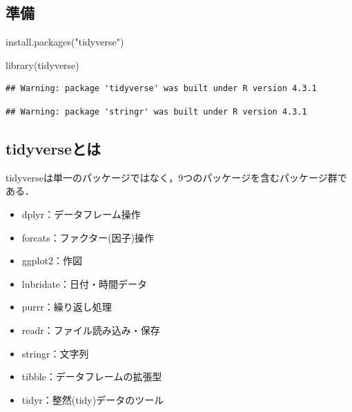 \documentclass[
]{article}
\newenvironment{Shaded}{\begin{snugshade}}{\end{snugshade}}
\newcommand{\FunctionTok}[1]{\textcolor[rgb]{0.00,0.00,0.00}{#1}}
\newcommand{\NormalTok}[1]{#1}
\newcommand{\StringTok}[1]{\textcolor[rgb]{0.31,0.60,0.02}{#1}}
\providecommand{\tightlist}{%
  \setlength{\itemsep}{0pt}\setlength{\parskip}{0pt}}
\begin{document}
\hypertarget{ux6e96ux5099-1}{%
\subsection{準備}\label{ux6e96ux5099-1}}

\begin{Shaded}
\begin{Highlighting}[]
\FunctionTok{install.packages}\NormalTok{(}\StringTok{"tidyverse"}\NormalTok{)}
\end{Highlighting}
\end{Shaded}

\begin{Shaded}
\begin{Highlighting}[]
\FunctionTok{library}\NormalTok{(tidyverse)}
\end{Highlighting}
\end{Shaded}

\begin{verbatim}
## Warning: package 'tidyverse' was built under R version 4.3.1
\end{verbatim}

\begin{verbatim}
## Warning: package 'stringr' was built under R version 4.3.1
\end{verbatim}

\hypertarget{tidyverseux3068ux306f}{%
\subsection{tidyverseとは}\label{tidyverseux3068ux306f}}

tidyverseは単一のパッケージではなく，9つのパッケージを含むパッケージ群である．

\begin{itemize}
\tightlist
\item
  dplyr：データフレーム操作
\item
  forcats：ファクター(因子)操作
\item
  ggplot2：作図
\item
  lubridate：日付・時間データ
\item
  purrr：繰り返し処理
\item
  readr：ファイル読み込み・保存
\item
  stringr：文字列
\item
  tibble：データフレームの拡張型
\item
  tidyr：整然(tidy)データのツール
\end{itemize}
\end{document}
